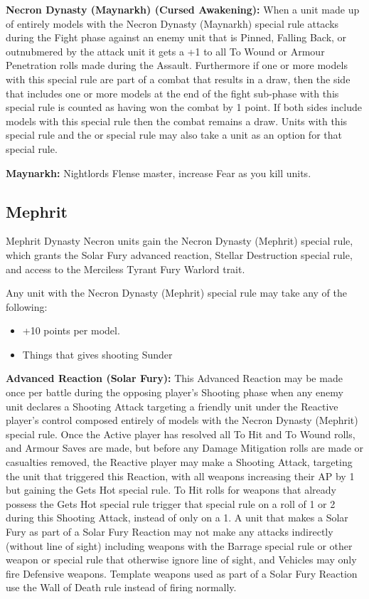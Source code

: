 \begin{multicols}{2}
\textbf{Necron Dynasty (Maynarkh) (Cursed Awakening):} When a unit made up of entirely models with the Necron Dynasty (Maynarkh) special rule attacks during the Fight phase against an enemy unit that is Pinned, Falling Back, or outnubmered by the attack unit it gets a +1 to all To Wound or Armour Penetration rolls made during the Assault. Furthermore if one or more models with this special rule are part of a combat that results in a draw, then the side that includes one or more models at the end of the fight sub-phase with this special rule is counted as having won the combat by 1 point. If both sides include models with this special rule then the combat remains a draw. Units with this special rule and the  or  special rule may also take a  unit as an option for that special rule.

\textbf{Maynarkh:} Nightlords Flense master, increase Fear as you kill units.


\newpage
\subsection{Mephrit}

Mephrit Dynasty Necron units gain the Necron Dynasty (Mephrit) special rule, which grants the Solar Fury advanced reaction, Stellar Destruction special rule, and access to the Merciless Tyrant Fury Warlord trait.

Any unit with the Necron Dynasty (Mephrit) special rule may take any of the following:
\begin{itemize}
	\item {} \dotfill +10 points per model.
	\item Things that gives shooting Sunder
\end{itemize}

\textbf{Advanced Reaction (Solar Fury):} This Advanced Reaction may be made once per battle during the opposing player’s Shooting phase when any enemy unit declares a Shooting Attack targeting a friendly unit under the Reactive player’s control composed entirely of models with the Necron Dynasty (Mephrit) special rule. Once the Active player has resolved all To Hit and To Wound rolls, and Armour Saves are made, but before any Damage Mitigation rolls are made or casualties removed, the Reactive player may make a Shooting Attack, targeting the unit that triggered this Reaction, with all weapons increasing their AP by 1 but gaining the Gets Hot special rule. To Hit rolls for weapons that already possess the Gets Hot special rule trigger that special rule on a roll of 1 or 2 during this Shooting Attack, instead of only on a 1. A unit that makes a Solar Fury as part of a Solar Fury Reaction may not make any attacks indirectly (without line of sight) including weapons with the Barrage special rule or other weapon or special rule that otherwise ignore line of sight, and Vehicles may only fire Defensive weapons. Template weapons used as part of a Solar Fury Reaction use the Wall of Death rule instead of firing normally.


\end{multicols}
